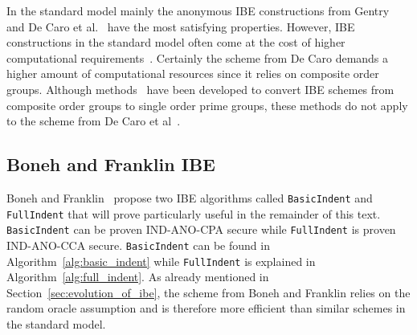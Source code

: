 In the standard model mainly the anonymous IBE constructions from Gentry~\cite{art:Gentry06} and De Caro et al.~\cite{art:CaroIP10} have the most satisfying properties. However, IBE constructions in the standard model often come at the cost of higher computational requirements~\cite{art:Boyen08}. Certainly the scheme from De Caro demands a higher amount of computational resources since it relies on composite order groups. Although methods~\cite{art:Freeman10,art:Lewko12} have been developed to convert IBE schemes from composite order groups to single order prime groups, these methods do not apply to the scheme from De Caro et al~\cite{art:LeeL10}.

\subsection{Boneh and Franklin IBE}
Boneh and Franklin~\cite{art:BonehF01} propose two IBE algorithms called \texttt{BasicIndent} and \texttt{FullIndent} that will prove particularly useful in the remainder of this text. \texttt{BasicIndent} can be proven IND-ANO-CPA secure while \texttt{FullIndent} is proven IND-ANO-CCA secure. \texttt{BasicIndent} can be found in Algorithm~\ref{alg:basic_indent} while \texttt{FullIndent} is explained in Algorithm~\ref{alg:full_indent}. As already mentioned in Section~\ref{sec:evolution_of_ibe}, the scheme from Boneh and Franklin relies on the random oracle assumption and is therefore more efficient than similar schemes in the standard model. 


